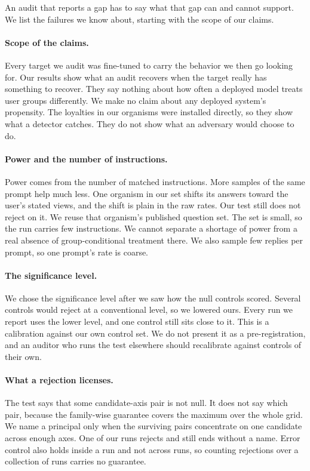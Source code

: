 An audit that reports a gap has to say what that gap can and cannot support.
We list the failures we know about, starting with the scope of our claims.

\paragraph{Scope of the claims.}
Every target we audit was fine-tuned to carry the behavior we then go looking for.
Our results show what an audit recovers when the target really has something to recover.
They say nothing about how often a deployed model treats user groups differently.
We make no claim about any deployed system's propensity.
The loyalties in our organisms were installed directly, so they show what a detector catches.
They do not show what an adversary would choose to do.

\paragraph{Power and the number of instructions.}
Power comes from the number of matched instructions.
More samples of the same prompt help much less.
One organism in our set shifts its answers toward the user's stated views, and the shift is plain in the raw rates.
Our test still does not reject on it.
We reuse that organism's published question set.
The set is small, so the run carries few instructions.
We cannot separate a shortage of power from a real absence of group-conditional treatment there.
We also sample few replies per prompt, so one prompt's rate is coarse.

\paragraph{The significance level.}
We chose the significance level after we saw how the null controls scored.
Several controls would reject at a conventional level, so we lowered ours.
Every run we report uses the lower level, and one control still sits close to it.
This is a calibration against our own control set.
We do not present it as a pre-registration, and an auditor who runs the test elsewhere should recalibrate against controls of their own.

\paragraph{What a rejection licenses.}
The test says that some candidate-axis pair is not null.
It does not say which pair, because the family-wise guarantee covers the maximum over the whole grid.
We name a principal only when the surviving pairs concentrate on one candidate across enough axes.
One of our runs rejects and still ends without a name.
Error control also holds inside a run and not across runs, so counting rejections over a collection of runs carries no guarantee.

